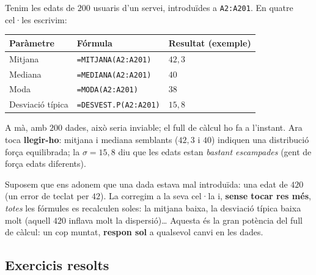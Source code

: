 \begin{exemple}
Tenim les edats de $200$ usuaris d'un servei, introduïdes a \texttt{A2:A201}. En
quatre cel·les escrivim:

\begin{center}
\begin{tabular}{l l l}
\toprule
\textbf{Paràmetre} & \textbf{Fórmula} & \textbf{Resultat (exemple)} \\
\midrule
Mitjana & \texttt{=MITJANA(A2:A201)} & $42,3$ \\
Mediana & \texttt{=MEDIANA(A2:A201)} & $40$ \\
Moda & \texttt{=MODA(A2:A201)} & $38$ \\
Desviació típica & \texttt{=DESVEST.P(A2:A201)} & $15,8$ \\
\bottomrule
\end{tabular}
\end{center}

A mà, amb $200$ dades, això seria inviable; el full de càlcul ho fa a l'instant. Ara
toca \textbf{llegir-ho}: mitjana i mediana semblants ($42,3$ i $40$) indiquen una
distribució força equilibrada; la $\sigma=15,8$ diu que les edats estan
\emph{bastant escampades} (gent de força edats diferents).
\end{exemple}

\begin{exemple}
Suposem que ens adonem que una dada estava mal introduïda: una edat de $\num{420}$
(un error de teclat per $42$). La corregim a la seva cel·la i, \textbf{sense tocar
res més}, \emph{totes} les fórmules es recalculen soles: la mitjana baixa, la
desviació típica baixa molt (aquell $\num{420}$ inflava molt la dispersió)\dots
Aquesta és la gran potència del full de càlcul: un cop muntat, \textbf{respon sol}
a qualsevol canvi en les dades.
\end{exemple}

\subsection{Exercicis resolts}

